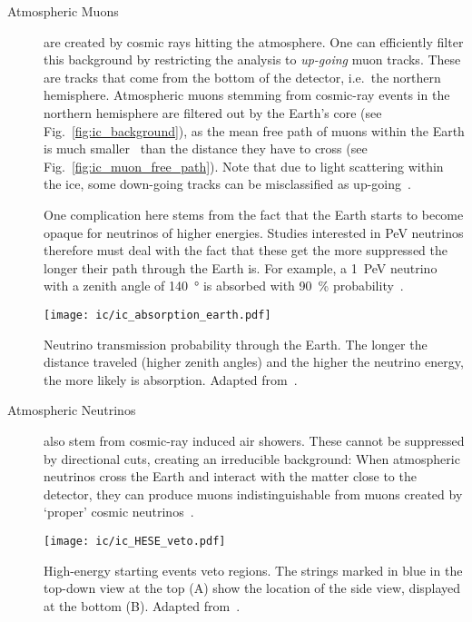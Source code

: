 \begin{description}
    \item[Atmospheric Muons] are created by cosmic rays hitting the atmosphere. One can efficiently filter this background by restricting the analysis to \textit{up-going} muon tracks. These are tracks that come from the bottom of the detector, i.e.\ the northern hemisphere. Atmospheric muons stemming from cosmic-ray events in the northern hemisphere are filtered out by the Earth's core (see Fig.~\ref{fig:ic_background}), as the mean free path of muons within the Earth is much smaller~ than the distance they have to cross (see Fig.~\ref{fig:ic_muon_free_path}). Note that due to light scattering within the ice, some down-going tracks can be misclassified as up-going~.

          One complication here stems from the fact that the Earth starts to become opaque for neutrinos of higher energies. Studies interested in \si{\peta\eV} neutrinos therefore must deal with the fact that these get the more suppressed the longer their path through the Earth is. For example, a \SI{1}{\peta\eV} neutrino with a zenith angle of \SI{140}{\degree} is absorbed with \SI{90}{\percent} probability~.
          \pagebreak

          \begin{marginfigure}
              \texttt{[image: ic/ic\_absorption\_earth.pdf]}
              \caption[Neutrino absorption in the Earth]{Neutrino transmission probability through the Earth. The longer the distance traveled (higher zenith angles) and the higher the neutrino energy, the more likely is absorption. Adapted from~\cite{Aartsen2017c}.}
          \end{marginfigure}
    \item[Atmospheric Neutrinos] also stem from cosmic-ray induced air showers. These cannot be suppressed by directional cuts, creating an irreducible background: When atmospheric neutrinos cross the Earth and interact with the matter close to the detector, they can produce muons indistinguishable from muons created by `proper' cosmic neutrinos~\cite{Ahlers2018a}.
          \begin{marginfigure}
              \texttt{[image: ic/ic\_HESE\_veto.pdf]}
              \caption[HESE veto regions]{High-energy starting events veto regions. The strings marked in blue in the top-down view at the top (A) show the location of the side view, displayed at the bottom (B). Adapted from~\cite{Aartsen2013}.}
          \end{marginfigure}
\end{description}

